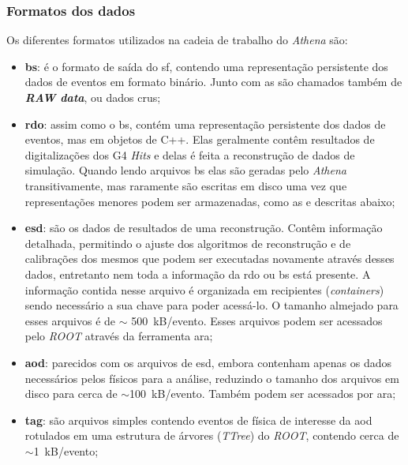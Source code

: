\subsubsection{Formatos dos dados}
\label{sssec:athena_dados}

Os diferentes formatos \cite{atlaswb} utilizados na cadeia de trabalho do \emph{Athena}
são:

\begin{itemize}
\item \textbf{\gls{bs}}: é o formato de saída do \glsdesc{sf}, contendo
uma representação persistente dos dados de eventos em formato
binário. Junto com as  são chamados também de \textbf{\emph{RAW
data}}, ou dados crus;
\item \textbf{\gls{rdo}}: assim como o \gls{bs}, contém uma representação persistente 
dos dados de eventos, mas em objetos de C++. Elas geralmente contêm resultados
de digitalizações dos G4 \emph{Hits} e delas é feita a reconstrução de dados de
simulação. Quando lendo arquivos \gls{bs} elas são geradas pelo \emph{Athena}
transitivamente, mas raramente são escritas em disco uma vez que representações
menores podem ser armazenadas, como as  e 
descritas abaixo;
\item \textbf{\gls{esd}}: são os dados de resultados de uma reconstrução. Contêm
informação detalhada, permitindo o ajuste dos algoritmos de reconstrução e
de calibrações dos mesmos que podem ser executadas novamente através desses dados, entretanto
nem toda a informação da \gls{rdo} ou \gls{bs} está presente. A
informação contida nesse arquivo é organizada em recipientes (\emph{containers})
sendo necessário a sua chave para poder acessá-lo. O tamanho almejado para esses
arquivos é de $\sim$ 500~kB/evento. Esses arquivos podem ser acessados pelo \emph{ROOT}
através da ferramenta \gls{ara};
\item \textbf{\gls{aod}}: parecidos com os arquivos de \gls{esd}, embora contenham
apenas os dados necessários pelos físicos para a análise, reduzindo o
tamanho dos arquivos em disco para cerca de $\sim$100~kB/evento. Também podem ser
acessados por \gls{ara};
\item \textbf{\gls{tag}}: são arquivos simples contendo eventos de física de
interesse da \gls{aod} rotulados em uma estrutura de árvores (\emph{TTree}) 
do \emph{ROOT}, contendo cerca de $\sim$1~kB/evento;
\end{itemize}


